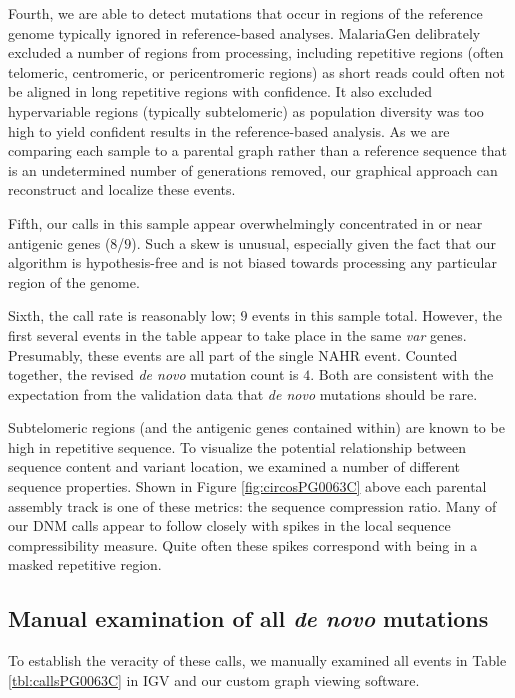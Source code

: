 Fourth, we are able to detect mutations that occur in regions of the reference genome typically ignored in reference-based analyses.  MalariaGen delibrately excluded a number of regions from processing, including repetitive regions (often telomeric, centromeric, or pericentromeric regions) as short reads could often not be aligned in long repetitive regions with confidence.  It also excluded hypervariable regions (typically subtelomeric) as population diversity was too high to yield confident results in the reference-based analysis.  As we are comparing each sample to a parental graph rather than a reference sequence that is an undetermined number of generations removed, our graphical approach can reconstruct and localize these events.

Fifth, our calls in this sample appear overwhelmingly concentrated in or near antigenic genes ($8$/$9$).  Such a skew is unusual, especially given the fact that our algorithm is hypothesis-free and is not biased towards processing any particular region of the genome.

Sixth, the call rate is reasonably low; $9$ events in this sample total.  However, the first several events in the table appear to take place in the same \textit{var} genes.  Presumably, these events are all part of the single NAHR event.  Counted together, the revised \textit{de novo} mutation count is $4$.  Both are consistent with the expectation from the validation data that \textit{de novo} mutations should be rare.

Subtelomeric regions (and the antigenic genes contained within) are known to be high in repetitive sequence.  To visualize the potential relationship between sequence content and variant location, we examined a number of different sequence properties.  Shown in Figure \ref{fig:circosPG0063C} above each parental assembly track is one of these metrics: the sequence compression ratio.  Many of our DNM calls appear to follow closely with spikes in the local sequence compressibility measure.  Quite often these spikes correspond with being in a masked repetitive region.

\subsection{Manual examination of all \textit{de novo} mutations}

To establish the veracity of these calls, we manually examined all events in Table \ref{tbl:callsPG0063C} in IGV and our custom graph viewing software.

